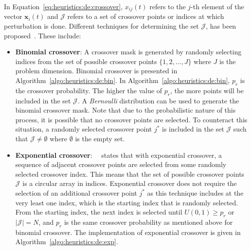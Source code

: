 {In Equation~\eqref{eq:heuristics:de:crossover}, $x_{ij}(t)$ refers to the $j$-th element of the vector $\boldsymbol{x}_{i}(t)$ and $\mathcal{J}$ refers to a set of crossover points or indices at which perturbation is done. Different techniques for determining the set $\mathcal{J}$, has been proposed~\cite{ref:storn:1996, ref:storn:1997}. These include:

\begin{itemize}
	\item \textbf{Binomial crossover}: A crossover mask is generated by randomly selecting indices from the set of possible crossover points $\{1,2,\dots,J\}$ where $J$ is the problem dimension. Binomial crossover is presented in Algorithm~\ref{algo:heuristics:de:bin}. In Algorithm~\ref{algo:heuristics:de:bin}, $p_{r}$ is the crossover probability. The higher the value of $p_{r}$, the more points will be included in the set $\mathcal{J}$. A \textit{Bernoulli} distribution can be used to generate the binomial crossover mask. Note that due to the probabilistic nature of this process, it is possible that no crossover points are selected. To counteract this situation, a randomly selected crossover point $j^{*}$ is included in the set $\mathcal{J}$ such that $\mathcal{J} \neq \emptyset$ where $\emptyset$ is the empty set.

	\item \textbf{Exponential crossover}:~\citeauthor{ref:engelbrecht:2007}~\cite{ref:engelbrecht:2007} states that with exponential crossover, a sequence of adjacent crossover points are selected from some randomly selected crossover index. This means that the set of possible crossover points $\mathcal{J}$ is a circular array in indices. Exponential crossover does not require the selection of an additional crossover point $j^{*}$ as this technique includes at the very least one index, which is the starting index that is randomly selected. From the starting index, the next index is selected until $U(0,1) \geq p_{r}$ or $|\mathcal{J}| = N$, and $p_{r}$ is the same crossover probability as mentioned above for binomial crossover. The implementation of exponential crossover is given in Algorithm~\ref{algo:heuristics:de:exp}.
\end{itemize}

}
